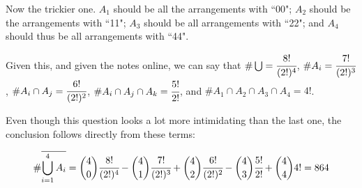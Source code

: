 \documentclass[a4paper]{article}
\begin{document}
Now the trickier one. $A_1$ should be all the arrangements with ``00"; $A_2$ should be the arrangements with ``11"; $A_3$ should be all arrangements with ``22"; and $A_4$ should thus be all arrangements with ``44".

Given this, and given the notes online, we can say that $\#\bigcup = \cfrac{8!}{(2!)^4}$, $\#A_i = \cfrac{7!}{(2!)^3}$, $\#A_i \cap A_j = \cfrac{6!}{(2!)^2}$, $\#A_i \cap A_j \cap A_k = \cfrac{5!}{2!}$, and $\#A_1 \cap A_2 \cap A_3 \cap A_4 = 4!$.

Even though this question looks a lot more intimidating than the last one, the conclusion follows directly from these terms:

\begin{equation}
\# \overline{\bigcup_{i=1}^4 A_i}  = \displaystyle \binom{4}{0} \cfrac{8!}{(2!)^4} - \binom{4}{1} \cfrac{7!}{(2!)^3} + \binom{4}{2} \cfrac{6!}{(2!)^2} - \binom{4}{3} \cfrac{5!}{2!} + \binom{4}{4} 4! = 864
\end{equation}
\end{document}
